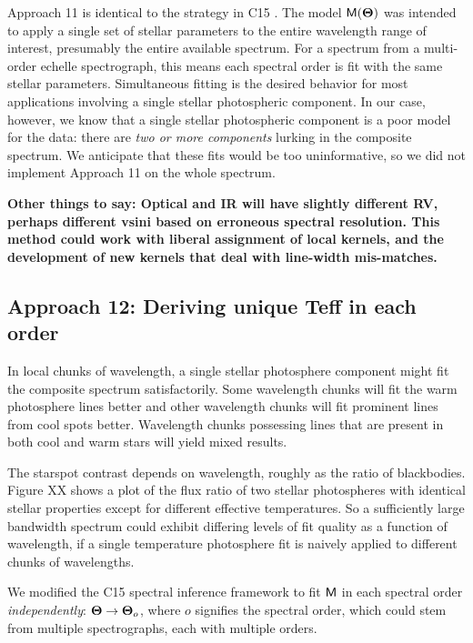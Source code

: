 \documentclass[onecolumn]{emulateapj}%
\newcommand{\iancze}{{\sc C15 }}
\begin{document}
Approach 11 is identical to the strategy in \iancze.  The model $\mathsf{M}({\bm \Theta})$ was intended to apply a single set of stellar parameters to the entire wavelength range of interest, presumably the entire available spectrum.  For a spectrum from a multi-order echelle spectrograph, this means each spectral order is fit with the same stellar parameters.  Simultaneous fitting is the desired behavior for most applications involving a single stellar photospheric component.  In our case, however, we know that a single stellar photospheric component is a poor model for the data: there are \emph{two or more components} lurking in the composite spectrum.  We anticipate that these fits would be too uninformative, so we did not implement Approach 11 on the whole spectrum.

\textbf{Other things to say: Optical and IR will have slightly different RV, perhaps different vsini based on erroneous spectral resolution.  This method could work with liberal assignment of local kernels, and the development of new kernels that deal with line-width mis-matches.}

\subsection{Approach 12: Deriving unique Teff in each order}
\label{sec:approach12}

In local chunks of wavelength, a single stellar photosphere component might fit the composite spectrum satisfactorily.  Some wavelength chunks will fit the warm photosphere lines better and other wavelength chunks will fit prominent lines from cool spots better.  Wavelength chunks possessing lines that are present in both cool and warm stars will yield mixed results.

The starspot contrast depends on wavelength, roughly as the ratio of blackbodies.  Figure XX shows a plot of the flux ratio of two stellar photospheres with identical stellar properties except for different effective temperatures.  So a sufficiently large bandwidth spectrum could exhibit differing levels of fit quality as a function of wavelength, if a single temperature photosphere fit is naively applied to different chunks of wavelengths.  

We modified the \iancze spectral inference framework to fit $\mathsf{M}$ in each spectral order \emph{independently}: ${\bm \Theta} \rightarrow {\bm \Theta}_o$, where $o$ signifies the spectral order, which could stem from multiple spectrographs, each with multiple orders.  
\end{document}

